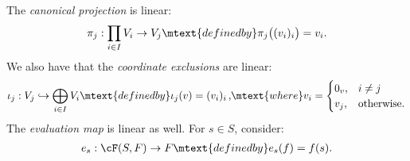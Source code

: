     \begin{example}
        The \textit{canonical projection} is linear:
            \begin{equation*}
            \begin{split}
                \pi_j: \prod_{i \in I}V_i \rightarrow V_j \mtext{defined by} \pi_j\bigl((v_i)_i\bigr) = v_i.
            \end{split}
            \end{equation*}
        We also have that the \textit{coordinate exclusions} are linear:
            \begin{equation*}
            \begin{split}
                \iota_j: V_j \hookrightarrow \bigoplus_{i \in I}V_i \mtext{defined by} \iota_j(v) = (v_i)_i \hspace{1.5pt}, \hspace{-2pt}\mtext{where} v_i = \begin{cases}
                    0_v, &i \neq j \\
                    v_j, &\text{otherwise}.
                \end{cases}
            \end{split}
            \end{equation*}
        The \textit{evaluation map} is linear as well. For $s \in S$, consider:
            \begin{equation*}
            \begin{split}
                e_s : \cF(S,F) \rightarrow F \mtext{defined by} e_s(f) = f(s).
            \end{split}
            \end{equation*}
    \end{example}

